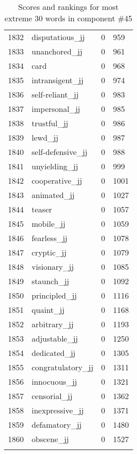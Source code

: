 \begin{longtable}[!htbp]{| rlr@{.}l |}
    1832 & disputatious\_jj & 0 & 959 \\
    1833 & unanchored\_jj & 0 & 961 \\
    1834 & card & 0 & 968 \\
    1835 & intransigent\_jj & 0 & 974 \\
    1836 & self-reliant\_jj & 0 & 983 \\
    1837 & impersonal\_jj & 0 & 985 \\
    1838 & trustful\_jj & 0 & 986 \\
    1839 & lewd\_jj & 0 & 987 \\
    1840 & self-defensive\_jj & 0 & 988 \\
    1841 & unyielding\_jj & 0 & 999 \\
    1842 & cooperative\_jj & 0 & 1001 \\
    1843 & animated\_jj & 0 & 1027 \\
    1844 & teaser & 0 & 1057 \\
    1845 & mobile\_jj & 0 & 1059 \\
    1846 & fearless\_jj & 0 & 1078 \\
    1847 & cryptic\_jj & 0 & 1079 \\
    1848 & visionary\_jj & 0 & 1085 \\
    1849 & staunch\_jj & 0 & 1092 \\
    1850 & principled\_jj & 0 & 1116 \\
    1851 & quaint\_jj & 0 & 1168 \\
    1852 & arbitrary\_jj & 0 & 1193 \\
    1853 & adjustable\_jj & 0 & 1250 \\
    1854 & dedicated\_jj & 0 & 1305 \\
    1855 & congratulatory\_jj & 0 & 1311 \\
    1856 & innocuous\_jj & 0 & 1321 \\
    1857 & censorial\_jj & 0 & 1362 \\
    1858 & inexpressive\_jj & 0 & 1371 \\
    1859 & defamatory\_jj & 0 & 1480 \\
    1860 & obscene\_jj & 0 & 1527 \\
    \hline
    \caption{Scores and rankings for most extreme 30 words in component \#45} \\
\end{longtable}
